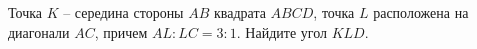 \begin{ex}
	\begin{condition}
		Точка \( K \) – середина стороны \( AB  \) квадрата \( ABCD \),	точка \( L  \) расположена на диагонали \( AC \), причем \( AL : LC = 3 : 1 \). Найдите угол \( KLD \).
	\end{condition}
\end{ex}